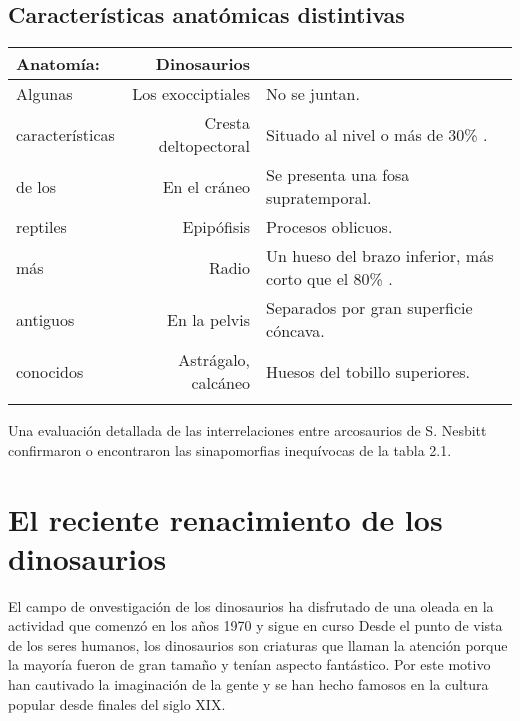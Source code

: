 \documentclass{article}
\begin{document}
\newpage
\subsection{Caracter\'isticas anat\'omicas distintivas}
\begin{tabular}{ l  r  l}
\hline
Anatom\'ia: & Dinosaurios\\
\hline \hline
Algunas & Los exocciptiales & No se juntan.\\\cline{2-2}
caracter\'isticas & Cresta deltopectoral & Situado al nivel o m\'as de 30\% .\\ \cline{2-3}
de los & En el cr\'aneo & Se presenta una fosa supratemporal.\\ \cline{2-2} 
reptiles & Epip\'ofisis & Procesos oblicuos.\\ \cline{2-3}
m\'as & Radio & Un hueso del brazo inferior, m\'as corto que el 80\% .\\ \cline{2-2}
antiguos & En la pelvis & Separados por gran superficie c\'oncava.\\ \cline{2-3}
conocidos & Astr\'agalo, calc\'aneo & Huesos del tobillo superiores.\\
\hline \bigskip \bigskip
\end{tabular}

Una evaluaci\'on detallada de las interrelaciones entre arcosaurios de S. Nesbitt confirmaron o encontraron las sinapomorfias inequ\'ivocas de la tabla 2.1.

\section{El reciente renacimiento de los dinosaurios}
El campo de onvestigaci\'on de los dinosaurios ha disfrutado de una oleada en la actividad que comenz\'o en los a\~nos 1970 y sigue en curso Desde el punto de vista de los seres humanos, los dinosaurios son criaturas que llaman la atenci\'on porque la mayor\'ia fueron de gran tama\~no y ten\'ian aspecto fant\'astico. Por este motivo han cautivado la imaginaci\'on de la gente y se han hecho famosos en la cultura popular desde finales del siglo XIX.
\end{document}
